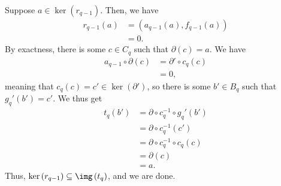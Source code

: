 \documentclass[10pt]{mypackage}
\begin{document}
\begin{solution}
  Suppose $a\in \ker\left( r_{q-1} \right)$. Then, we have 
  \begin{align*}
    r_{q-1}\left( a \right) &= \left( a_{q-1}(a),f_{q-1}(a) \right)\\
                            &= 0.
  \end{align*}
  By exactness, there is some $c\in C_q$ such that $\partial (c) = a$. We have
  \begin{align*}
    a_{q-1}\circ \partial(c) &= \partial'\circ c_q\left( c \right)\\
                             &= 0,
  \end{align*}
  meaning that $c_q\left( c \right) = c'\in \ker\left( \partial' \right)$, so there is some $b'\in B_q$ such that $g_q'\left( b' \right) = c'$. We thus get
  \begin{align*}
    t_q\left( b' \right) &= \partial\circ c_q^{-1}\circ g_q'\left( b' \right)\\
                         &= \partial\circ c_q^{-1}\left( c' \right)\\
                         &= \partial\circ c_q^{-1}\circ c_q\left( c \right)\\
                         &= \partial(c)\\
                         &= a.
  \end{align*}
  Thus, $\ker\left( r_{q-1} \right)\subseteq \img\left( t_q \right)$, and we are done.
\end{solution}
\end{document}
